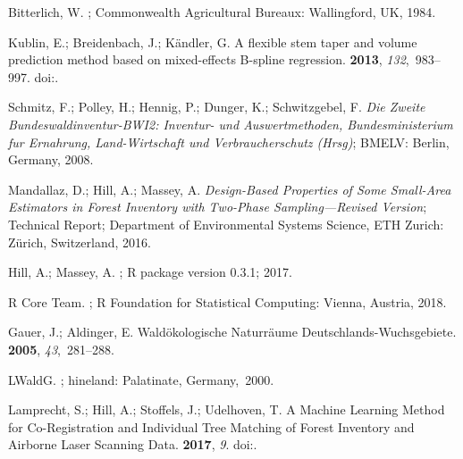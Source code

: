 \documentclass[remotesensing,article,accept,moreauthors,pdftex,10pt,a4paper]{Definitions/mdpi}
\begin{document}
\begin{thebibliography}{999}
Bitterlich, W.
;
  Commonwealth Agricultural Bureaux:  Wallingford, UK,  1984.

Kublin, E.; Breidenbach, J.; K{\"a}ndler, G.
\newblock A flexible stem taper and volume prediction method based on
  mixed-effects B-spline regression.
 {\bf 2013}, {\em
  132},~983--997.
\newblock
  doi:{\href{https://doi.org/10.1007/s10342-013-0715-0}{}}.

Schmitz, F.; Polley, H.; Hennig, P.; Dunger, K.; Schwitzgebel, F.
\newblock \emph{Die Zweite Bundeswaldinventur-BWI2: Inventur- und
  Auswertmethoden, Bundesministerium fur Ernahrung, Land-Wirtschaft
  und Verbraucherschutz (Hrsg)};  BMELV: Berlin, Germany, 2008.

Mandallaz, D.; Hill, A.; Massey, A.
\newblock \emph{Design-Based Properties of Some Small-Area Estimators in Forest
  Inventory with Two-Phase Sampling---Revised Version};
\newblock Technical Report; Department of Environmental Systems Science, ETH
  Zurich:  Zürich, Switzerland, 2016.
 

Hill, A.; Massey, A.
; R package version 0.3.1; 2017.

{R Core Team}.
;
\newblock R Foundation for Statistical Computing: Vienna, Austria,  2018.

Gauer, J.; Aldinger, E.
\newblock Wald{\"o}kologische Naturr{\"a}ume Deutschlands-Wuchsgebiete.
 {\bf 2005}, {\em 43},~281--288.

LWaldG.
;
hineland: {P}alatinate, {G}ermany,~2000.

Lamprecht, S.; Hill, A.; Stoffels, J.; Udelhoven, T.
\newblock A Machine Learning Method for Co-Registration and Individual Tree
  Matching of Forest Inventory and Airborne Laser Scanning Data.
 {\bf 2017}, {\em 9}.
\newblock
  doi:{\href{https://doi.org/10.3390/rs9050505}{}}.


\end{thebibliography}
\end{document}
